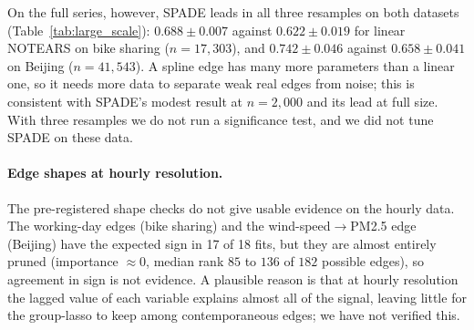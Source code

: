 On the full series, however, SPADE leads in all three resamples on both datasets
(Table~\ref{tab:large_scale}): $0.688\pm0.007$ against $0.622\pm0.019$ for linear
NOTEARS on bike sharing ($n{=}17{,}303$), and $0.742\pm0.046$ against
$0.658\pm0.041$ on Beijing ($n{=}41{,}543$). A spline edge has many more
parameters than a linear one, so it needs more data to separate weak real edges
from noise; this is consistent with SPADE's modest result at $n{=}2{,}000$ and its
lead at full size. With three resamples we do not run a significance test, and
we did not tune SPADE on these data.

\paragraph{Edge shapes at hourly resolution.} The pre-registered shape checks do
not give usable evidence on the hourly data. The working-day edges (bike
sharing) and the wind-speed$\to$PM2.5 edge (Beijing) have the expected sign in
17 of 18 fits, but they are almost entirely pruned (importance $\approx0$,
median rank $85$ to $136$ of $182$ possible edges), so agreement in sign is not
evidence. A plausible reason is that at hourly resolution the lagged value of
each variable explains almost all of the signal, leaving little for the
group-lasso to keep among contemporaneous edges; we have not verified this.

\begin{table}[t]
\centering
\caption{Hourly bike sharing, common sample ($2{,}000$-row block-bootstrap
resamples, six resamples, $d{=}14$): background-knowledge AUROC (mean$\pm$std),
forbidden edges among each method's top-14 edges (all edges for SCORE and NoGAM),
domain-certain edges recovered (of $9$), and paired Wilcoxon $p$ for SPADE
versus each method. Linear NOTEARS and SPADE are statistically
indistinguishable.}
\label{tab:bike_hourly}
\end{table}

\begin{table}[t]
\centering
\caption{Hourly Beijing PM2.5, common sample (six resamples, $d{=}14$); layout as
in Table~\ref{tab:bike_hourly}, with $10$ domain-certain edges. SPADE and linear
NOTEARS tie at $0.669$.}
\label{tab:beijing}
\end{table}

\begin{table}[t]
\centering
\caption{Full-series check (BK-AUROC, mean$\pm$std over three resamples; the first
resample is the original series, the others are full-length block bootstraps).
SPADE leads on both datasets in all three resamples. SPADE ran on a GPU
here; the slower methods (SCORE, NoGAM, GraN-DAG, DAGMA-nonlinear) were not run
at this size.}
\label{tab:large_scale}
\end{table}

